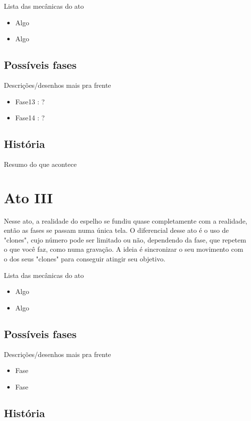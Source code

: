 \documentclass[a4paper, 11pt]{article}
\begin{document}
\begin{itemize}
	Lista das mecânicas do ato 
	\begin{itemize} 
		\item Algo 
		\item Algo 
	\end{itemize} 
 
\subsection{Possíveis fases} 
 
	Descrições/desenhos mais pra frente 
	\begin{itemize} 
		\item Fase13 : ?
		\item Fase14 : ?
	\end{itemize} 
 
\subsection{História} 
 
	Resumo do que acontece 
 
\section{Ato III} 
 
	Nesse ato, a realidade do espelho se fundiu quase completamente com a realidade, então as fases se passam numa única 
	tela. O diferencial desse ato é o uso de "clones", cujo número pode ser limitado ou não, dependendo da fase, que repetem o que você faz, como numa gravação. A ideia é sincronizar o seu movimento com o dos seus "clones" para conseguir atingir seu objetivo. 
 
	Lista das mecânicas do ato 
	\begin{itemize} 
		\item Algo 
		\item Algo 
	\end{itemize} 
 
\subsection{Possíveis fases} 
 
	Descrições/desenhos mais pra frente 
	\begin{itemize} 
		\item Fase 
		\item Fase 
	\end{itemize} 
 
\subsection{História} 
 

\end{itemize}
\end{document}
